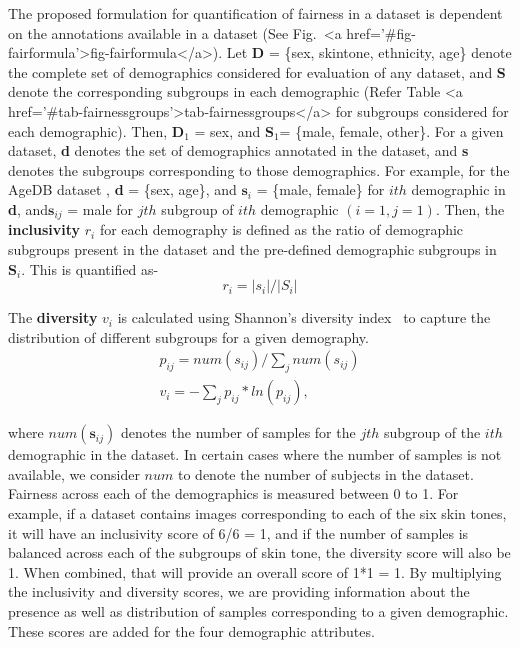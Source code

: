 \documentclass[journal]{IEEEtran}
\begin{document}
The proposed formulation for quantification of fairness in a dataset is dependent on the annotations available in a dataset (See Fig.~<a href='#fig-fairformula'>fig-fairformula</a>). Let \textbf{D} = \{sex, skintone, ethnicity, age\} denote the complete set of demographics considered for evaluation of any dataset, and \textbf{S} denote the corresponding subgroups in each demographic (Refer Table <a href='#tab-fairnessgroups'>tab-fairnessgroups</a> for subgroups considered for each demographic). Then, $\textbf{D}_1$ = sex, and $\textbf{S}_1$= \{male, female, other\}. For a given dataset, \textbf{d} denotes the set of demographics annotated in the dataset, and \textbf{s} denotes the subgroups corresponding to those demographics. For example, for the AgeDB dataset \cite{moschoglou2017agedb}, \textbf{d} = \{sex, age\}, and $\textbf{s}_i$ = \{male, female\} for $ith$ demographic in \textbf{d}, and$\textbf{s}_{ij}$ = male for $jth$ subgroup of $ith$ demographic $(i=1, j=1)$. Then, the \textbf{inclusivity} $r_i$ for each demography is defined as the ratio of demographic subgroups present in the dataset and the pre-defined demographic subgroups in $\textbf{S}_i$. This is quantified as-
\begin{equation}
 r_i = |s_i|/|S_i|
\end{equation}

The \textbf{diversity} $v_i$ is calculated using Shannon's diversity index~\cite{shannon1948mathematical} to capture the distribution of different subgroups for a given demography. 
\begin{gather}
p_{ij} = num(s_{ij})/\sum_j{num(s_{ij})}\\
v_i = - \sum_j{p_{ij} * ln(p_{ij})},
\end{gather}

where $num(\textbf{s}_{ij})$ denotes the number of samples for the $jth$ subgroup of the $ith$ demographic in the dataset. In certain cases where the number of samples is not available, we consider $num$ to denote the number of subjects in the dataset. Fairness across each of the demographics is measured between 0 to 1. For example, if a dataset contains images corresponding to each of the six skin tones, it will have an inclusivity score of 6/6 = 1, and if the number of samples is balanced across each of the subgroups of skin tone, the diversity score will also be 1. When combined, that will provide an overall score of 1*1 = 1. By multiplying the inclusivity and diversity scores, we are providing information about the presence as well as distribution of samples corresponding to a given demographic. These scores are added for the four demographic attributes.
\end{document}
